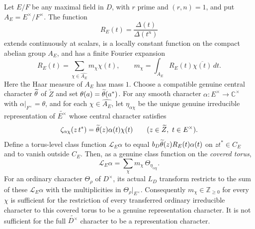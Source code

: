 \begin{lemma}\label{W:lem:toral-Fourier}
Let $E/F$ be any maximal field in $D$, with $r$ prime and
$(r,n)=1$, and put $A_E=E^\times/F^\times$.  The function
\[
 R_E(t)=\frac{\Delta(t)}{\Delta(t^n)}
\]
extends continuously at scalars, is a locally constant function
on the compact abelian group $A_E$, and has a finite Fourier expansion
\begin{equation}\label{W:eq:R-Fourier}
 R_E(t)=\sum_{\chi\in\widehat{A_E}}m_\chi\chi(t),
 \qquad
 m_\chi=\int_{A_E}R_E(t)\overline{\chi(t)}\,dt.
\end{equation}
Here the Haar measure of $A_E$ has mass $1$.
Choose a compatible genuine central character
$\widetilde\theta$ of $\widetilde Z$ and set
$\theta(a)=\widetilde\theta(a^*)$.  For any smooth character
$\alpha:E^\times\to\mathbb C^\times$ with
$\alpha|_{F^\times}=\theta$, and for each $\chi\in\widehat{A_E}$,
let $\eta_{\alpha\chi}$ be the unique genuine irreducible
representation of $\widetilde{E^\times}$ whose central character
satisfies
\[
 \zeta_{\alpha\chi}(z\,t^*)=
 \widetilde\theta(z)\alpha(t)\chi(t)
 \qquad(z\in\widetilde Z,\ t\in E^\times).
\]
Define a torus-level class function $\mathcal L_E\alpha$ to equal
$b_D\widetilde\theta(z)R_E(t)\alpha(t)$ on $z t^*\in C_E$
and to vanish outside $C_E$.  Then, as a genuine class function
on the \emph{covered torus},
\begin{equation}\label{W:eq:toral-branch}
 \mathcal L_E\alpha
 =\sum_\chi m_\chi\,\Theta_{\eta_{\alpha\chi}}.
\end{equation}
For an ordinary character $\Theta_\rho$ of $D^\times$,
its actual $L_D$ transform restricts to the sum of these
$\mathcal L_E\alpha$ with the multiplicities in
$\Theta_\rho|_{E^\times}$.
Consequently $m_\chi\in\mathbb Z_{\geq0}$ for every $\chi$
is sufficient for the restriction of every transferred ordinary
irreducible character to this covered torus to be a genuine
representation character.  It is not sufficient for the full
$\widetilde{D^\times}$ character to be a representation character.
\end{lemma}
